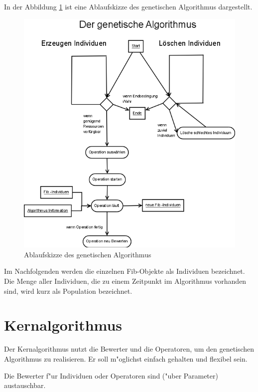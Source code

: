 In der Abbildung \ref{figGeneticAlgorithmus} ist eine Ablaufskizze des genetischen Algorithmus dargestellt.

\begin{figure}[htbp]
\begin{center}
  \includegraphics[scale=0.4]{algorithmus}
\end{center}
\caption{Ablaufskizze des genetischen Algorithmus}
\label{figGeneticAlgorithmus}
\end{figure}


Im Nachfolgenden werden die einzelnen Fib-Objekte als Individuen bezeichnet. Die Menge aller Individuen, die zu einem Zeitpunkt im Algorithmus vorhanden sind, wird kurz als Population bezeichnet.


\section{Kernalgorithmus}

Der Kernalgorithmus nutzt die Bewerter und die Operatoren, um den genetischen Algorithmus zu realisieren. Er soll m"oglichst einfach gehalten und flexibel sein.

Die Bewerter f"ur Individuen oder Operatoren sind ("uber Parameter) austauschbar.

